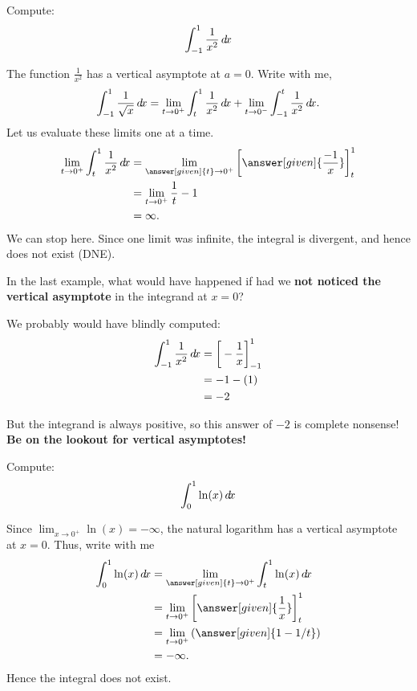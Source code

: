 \documentclass{ximera}
\begin{document}
\begin{example}	
  Compute:
  \[
  \int_{-1}^1 \frac{1}{x^2} \mathop{}\!d\! x
  \]
  \begin{explanation}
    The function $\frac{1}{x^2}$ has a vertical asymptote at $a=0$.
    Write with me,
  \[
  \int_{-1}^1 \frac{1}{\sqrt{x}} \mathop{}\!d\! x = \lim_{t \to 0^+} \int_{t}^1 \frac{1}{x^2} \mathop{}\!d\! x  + \lim_{t \to 0^-} \int_{-1}^t \frac{1}{x^2} \mathop{}\!d\! x.
  \]  
  Let us evaluate these limits one at a time.
  \begin{align*}
    \lim_{t \to 0^+} \int_{t}^1 \frac{1}{x^2} \d x  &=  \lim_{\answer[given]{t} \to 0^+} \eval{\answer[given]{\frac{-1}{x}}}_t^1 \\
    &=  \lim_{t \to 0^+} \frac{1}{t}-1\\
    &= \infty.
  \end{align*}
    We can stop here. Since one limit was infinite, the integral is
    divergent, and hence does not exist (DNE).
  \end{explanation}
\end{example}

\begin{warning}
In the last example, what would have happened if had we \textbf{not
  noticed the vertical asymptote} in the integrand at $x=0$?

We probably would have blindly computed:
\begin{align*}
  \int_{-1}^1\frac1{x^2}\mathop{}\!d\! x &= \bigg[ -\frac{1}{x} \bigg]_{-1}^1\\
  &= -1 - (1)\\
  &=-2
\end{align*}

But the integrand is always positive, so this answer of $-2$ is
complete nonsense! \textbf{Be on the lookout for vertical asymptotes!}
\end{warning}


\begin{example}
  Compute:
  \[
  \int_0^1 \ln(x)\mathop{}\!d\! x
  \]
  \begin{explanation}
    Since $\lim_{x\to 0^+} \ln(x) = -\infty$, the natural logarithm
    has a vertical asymptote at $x = 0$. Thus, write with me
    \begin{align*}
    \int_0^1 \ln(x) \d x &=\lim_{\answer[given]{t}\to 0^+} \int_t^1 \ln(x) \d x \\
    &= \lim_{t\to 0^+} \eval{\answer[given]{\frac{1}{x}}}_t^1 \\
    &= \lim_{t\to 0^+} \left(\answer[given]{1-1/t}\right) \\
    &= -\infty.
    \end{align*}
    Hence the integral does not exist.
  \end{explanation}
\end{example}
\end{document}
